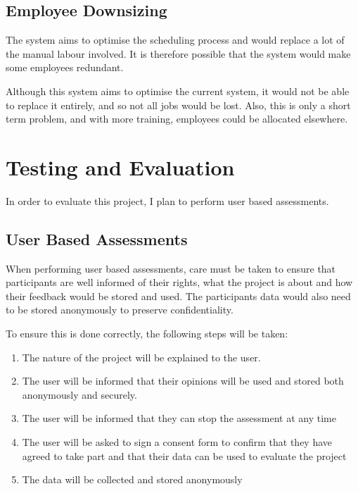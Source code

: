 \subsection{Employee Downsizing}

The system aims to optimise the scheduling process and would replace a lot of the manual labour involved. It is therefore possible that the system would make some employees redundant.

Although this system aims to optimise the current system, it would not be able to replace it entirely, and so not all jobs would be lost. Also, this is only a short term problem, and with more training, employees could be allocated elsewhere.

\section{Testing and Evaluation}

In order to evaluate this project, I plan to perform user based assessments.

\subsection{User Based Assessments}

When performing user based assessments, care must be taken to ensure that participants are well informed of their rights, what the project is about and how their feedback would be stored and used. The participants data would also need to be stored anonymously to preserve confidentiality.

To ensure this is done correctly, the following steps will be taken:

\begin{enumerate}
	\item The nature of the project will be explained to the user.
	\item The user will be informed that their opinions will be used and stored both anonymously and securely.
	\item The user will be informed that they can stop the assessment at any time
	\item The user will be asked to sign a consent form to confirm that they have agreed to take part and that their data can be used to evaluate the project
	\item The data will be collected and stored anonymously
\end{enumerate}